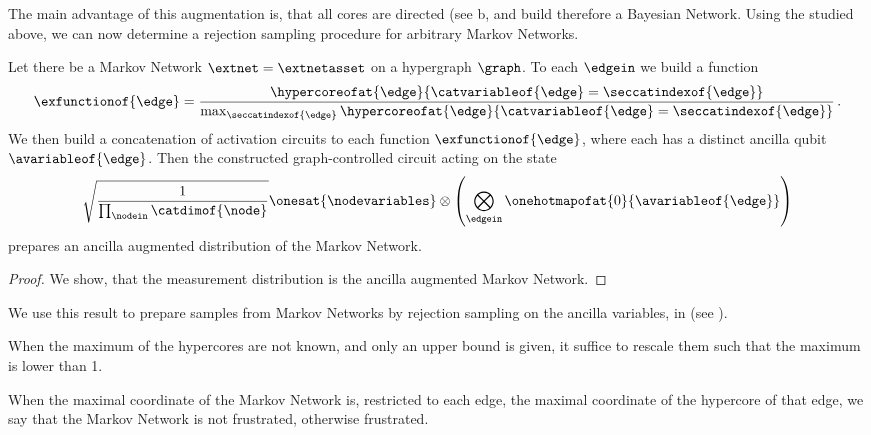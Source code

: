 The main advantage of this augmentation is, that all cores are directed (see b, and build therefore a Bayesian Network.
Using the \activationCircuits{} studied above, we can now determine a rejection sampling procedure for arbitrary Markov Networks.

\begin{lemma}
    Let there be a Markov Network $\extnet=\extnetasset$ on a hypergraph $\graph$.
    To each $\edgein$ we build a function
    \begin{align*}
        \exfunctionof{\edge}
        =
        \frac{
            \hypercoreofat{\edge}{\catvariableof{\edge}=\seccatindexof{\edge}}
        }{\max_{\seccatindexof{\edge}}\hypercoreofat{\edge}{\catvariableof{\edge}=\seccatindexof{\edge}}} \, .
    \end{align*}
    We then build a concatenation of activation circuits to each function $\exfunctionof{\edge}$, where each has a distinct ancilla qubit $\avariableof{\edge}$.
    Then the constructed graph-controlled circuit acting on the state
    \begin{align*}
        \sqrt{\frac{1}{\prod_{\nodein}\catdimof{\node}}}\onesat{\nodevariables} \otimes \left(\bigotimes_{\edgein}\onehotmapofat{0}{\avariableof{\edge}}\right)
    \end{align*}
    prepares an ancilla augmented distribution of the Markov Network.
\end{lemma}
\begin{proof}
    We show, that the measurement distribution is the ancilla augmented Markov Network.
\end{proof}

We use this result to prepare samples from Markov Networks by rejection sampling on the ancilla variables, in \qcreason{} (see ).

When the maximum of the hypercores are not known, and only an upper bound is given, it suffice to rescale them such that the maximum is lower than 1.

When the maximal coordinate of the Markov Network is, restricted to each edge, the maximal coordinate of the hypercore of that edge, we say that the Markov Network is not frustrated, otherwise frustrated.

